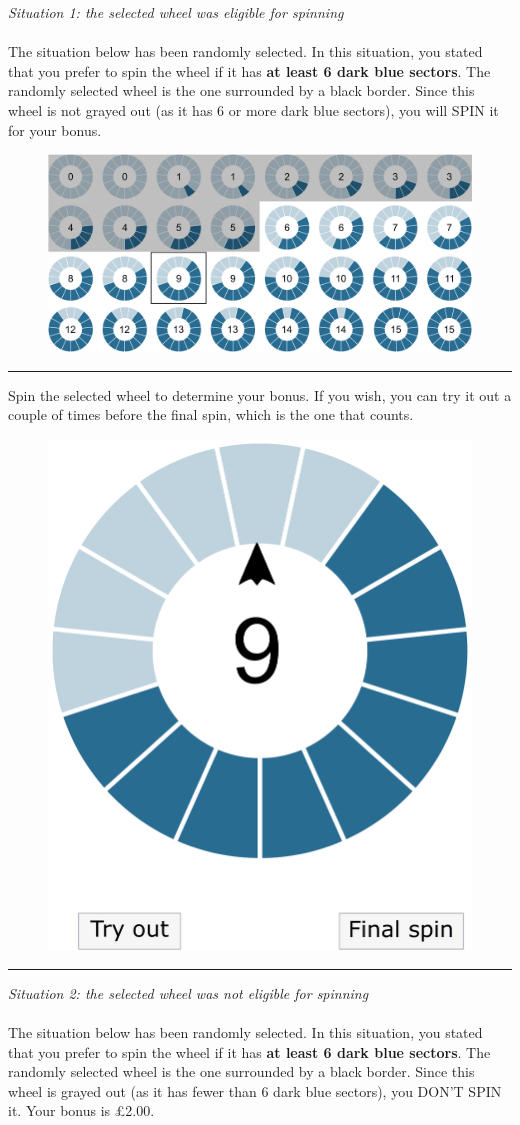 \noindent \textit{Situation 1: the selected wheel was eligible for spinning}\\
\\
\noindent The situation below has been randomly selected.
In this situation, you stated that you prefer to spin the wheel if it has \textbf{at least 6 dark blue sectors}.
The randomly selected wheel is the one surrounded by a black border.
Since this wheel is not grayed out (as it has 6 or more dark blue sectors), you will SPIN it for your bonus.
\begin{figure}[h!]
	\centering
	{\includegraphics[width=\linewidth]{Eligible.pdf}}
\end{figure}

\noindent \rule{\linewidth}{0.4pt}
\newpage
\noindent Spin the selected wheel to determine your bonus.
If you wish, you can try it out a couple of times before the final spin, which is the one that counts.
\begin{figure}[h!]
	\centering
	{\includegraphics[width=0.4\linewidth]{FinalSpin.pdf}}
\end{figure}

\noindent \rule{\linewidth}{0.4pt}
\newpage
\noindent \textit{Situation 2: the selected wheel was not eligible for spinning}\\
\\
\noindent The situation below has been randomly selected.
In this situation, you stated that you prefer to spin the wheel if it has \textbf{at least 6 dark blue sectors}.
The randomly selected wheel is the one surrounded by a black border.
Since this wheel is grayed out (as it has fewer than 6 dark blue sectors), you DON'T SPIN it.
Your bonus is £2.00.


